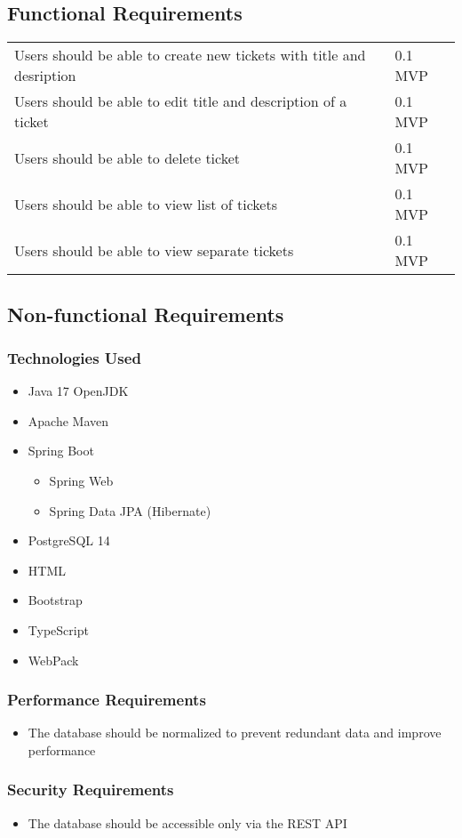 \documentclass[a4paper]{article}
\begin{document}
    \subsection{Functional Requirements}
    \begin{table}[htbp]
        \centering
        \begin{tabularx}{\linewidth}{|X|l|}
            \hline
            \centering{Description} & \centering{Version} \tabularnewline \hline
            Users should be able to create new tickets with title and desription & 0.1 MVP \tabularnewline \hline
            Users should be able to edit title and description of a ticket & 0.1 MVP \tabularnewline \hline
            Users should be able to delete ticket & 0.1 MVP \tabularnewline \hline
            Users should be able to view list of tickets & 0.1 MVP \tabularnewline \hline
            Users should be able to view separate tickets & 0.1 MVP \tabularnewline \hline
        \end{tabularx}
    \end{table}

    \subsection{Non-functional Requirements}
    \subsubsection{Technologies Used}
    \begin{itemize}
        \item Java 17 OpenJDK
        \item Apache Maven
        \item Spring Boot
        \begin{itemize}
            \item Spring Web
            \item Spring Data JPA (Hibernate)
        \end{itemize}
        \item PostgreSQL 14
        \item HTML
        \item Bootstrap
        \item TypeScript
        \item WebPack
    \end{itemize}

    \subsubsection{Performance Requirements}
    \begin{itemize}
        \item The database should be normalized to prevent redundant data and improve performance
    \end{itemize}

    \subsubsection{Security Requirements}
    \begin{itemize}
        \item The database should be accessible only via the REST API
    \end{itemize}
\end{document}
